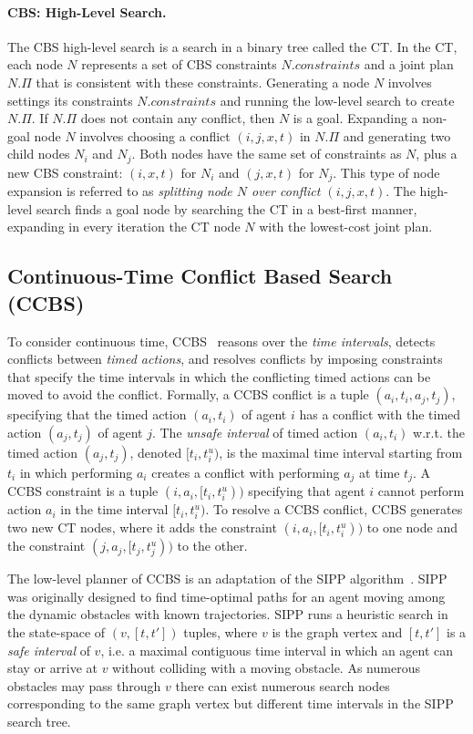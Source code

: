 \documentclass[letterpaper]{article} %
\newcommand{\cbs}{\ac{CBS}\xspace}
\newcommand{\ccbs}{\ac{CCBS}\xspace}
\newcommand{\ct}{\ac{CT}\xspace}
\newcommand{\sipp}{\ac{SIPP}\xspace}
\newcommand{\const}{\textit{constraints}\xspace}
\begin{document}
\paragraph{\cbs: High-Level Search.}
The \cbs high-level search is a search in a binary tree called the \ct. 
In the \ct, each node $N$ represents a set of \cbs constraints $N.\const$
and a joint plan $N.\Pi$ that is consistent with these constraints. 
Generating a node $N$ involves settings its constraints $N.\const$ and running the low-level search to create $N.\Pi$. 
If $N.\Pi$ does not contain any conflict, then $N$ is a goal. 
Expanding a non-goal node $N$ involves choosing a conflict $(i,j,x,t)$ in $N.\Pi$ 
and generating two child nodes $N_i$ and $N_j$. 
Both nodes have the same set of constraints as $N$, plus a new \cbs constraint: $(i,x,t)$ for $N_i$ and $(j,x,t)$ for $N_j$. 
This type of node expansion is referred to as \emph{splitting node $N$ over conflict $(i,j,x,t)$}.
The high-level search finds a goal node by searching the \ct in a best-first manner, expanding in every iteration the \ct node $N$ with the lowest-cost joint plan.



\subsection{Continuous-Time Conflict Based Search (CCBS)}


To consider continuous time, \ccbs~\cite{andreychuk2019multi} reasons over the \emph{time intervals}, 
detects conflicts between \emph{timed actions}, 
and resolves conflicts by imposing constraints that specify the time intervals in which the conflicting timed actions can be moved to avoid the conflict.  
Formally, a \ccbs conflict is a tuple $(a_i, t_i, a_j, t_j)$, specifying that the timed action $(a_i, t_i)$ of agent $i$ has a conflict with the timed action $(a_j, t_j)$ of agent $j$.  
The \emph{unsafe interval} of timed action $(a_i, t_i)$ w.r.t. the timed action $(a_j, t_j)$, denoted $[t_i, t_i^u)$, is the maximal time interval starting from $t_i$ in which performing $a_i$ creates a conflict with performing $a_j$ at time $t_j$.
A \ccbs constraint is a tuple $(i, a_i, [t_i, t_i^u))$ specifying that agent $i$ cannot perform action $a_i$ in the time interval $[t_i, t_i^u)$. 
To resolve a \ccbs conflict, \ccbs generates two new \ct nodes, 
where it adds the constraint $(i, a_i, [t_i, t_i^u))$ to one node 
and the constraint $(j, a_j, [t_j, t_j^u))$ to the other. 

The low-level planner of \ccbs is an adaptation of the \sipp algorithm~\cite{phillips2011sipp}. 
\sipp was originally designed to find time-optimal paths for an agent moving among the dynamic obstacles with known trajectories. 
\sipp runs a heuristic search in the state-space of $(v, [t, t'])$ tuples, where $v$ is the graph vertex and $[t, t']$ is a \emph{safe interval} of $v$, i.e. a maximal contiguous time interval in which an agent can stay or arrive at $v$ without colliding with a moving obstacle. As numerous obstacles may pass through $v$ there can exist numerous search nodes corresponding to the same graph vertex but different time intervals in the \sipp search tree. 
\end{document}
